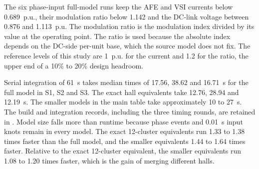 The six phase-input full-model runs keep the AFE and VSI currents below 0.689~p.u., their modulation ratio below 1.142 and the DC-link voltage between 0.876 and 1.113~p.u.
The modulation ratio is the modulation index divided by its value at the operating point.
The ratio is used because the absolute index depends on the DC-side per-unit base, which the source model does not fix.
The reference levels of this study are 1~p.u. for the current and 1.2 for the ratio, the upper end of a 10\% to 20\% design headroom.

Serial integration of 61~s takes median times of 17.56, 38.62 and 16.71~s for the full model in S1, S2 and S3.
The exact hall equivalents take 12.76, 28.94 and 12.19~s.
The smaller models in the main table take approximately 10 to 27~s.
The build and integration records, including the three timing rounds, are retained in .
Model size falls more than runtime because phase events and 0.01~s input knots remain in every model.
The exact 12-cluster equivalents run 1.33 to 1.38 times faster than the full model, and the smaller equivalents 1.44 to 1.64 times faster.
Relative to the exact 12-cluster equivalent, the smaller equivalents run 1.08 to 1.20 times faster, which is the gain of merging different halls.
